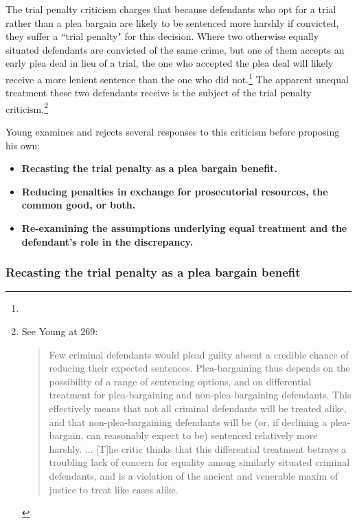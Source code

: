 The trial penalty criticism charges that because defendants who opt for a trial rather than a plea bargain are likely to be sentenced more harshly if convicted, they suffer a ``trial penalty" for this decision. Where two otherwise equally situated defendants are convicted of the same crime, but one of them accepts an early plea deal in lieu of a trial, the one who accepted the plea deal will likely receive a more lenient sentence than the one who did not.\footnote{} The apparent unequal treatment these two defendants receive is the subject of the trial penalty criticism.\footnote{See Young at 269: 
\begin{quote}
    Few criminal defendants would plead guilty absent a credible chance of reducing their expected sentences. Plea-bargaining thus depends on the possibility of a range of sentencing options, and on differential treatment for plea-bargaining and non-plea-bargaining defendants. This effectively means that not all criminal defendants will be treated alike, and that non-plea-bargaining defendants will be (or, if declining a plea-bargain, can reasonably expect to be) sentenced relatively more harshly. ... [T]he critic thinks that this differential treatment betrays a troubling lack of concern for equality among similarly situated criminal defendants, and is a violation of the ancient and venerable maxim of justice to treat like cases alike.
\end{quote}}

Young examines and rejects several responses to this criticism before proposing his own:

\begin{itemize}
    \item \textbf{Recasting the trial penalty as a plea bargain benefit.} 
    \item \textbf{Reducing penalties in exchange for prosecutorial resources, the common good, or both.} 
    \item \textbf{Re-examining the assumptions underlying equal treatment and the defendant's role in the discrepancy.} 
\end{itemize}

\subsubsection{Recasting the trial penalty as a plea bargain benefit}

